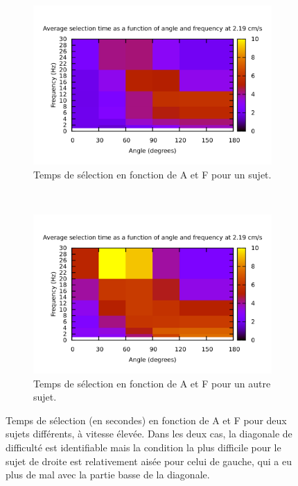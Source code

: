 	\begin{figure}[!htb]
		\begin{subfigure}[t]{0.49\textwidth}
			\centering
			\includegraphics[width=\textwidth]{figures/ch4/08_times_081}
			\caption{Temps de sélection en fonction de A et F pour un sujet.}
			\label{fig:08times}
		\end{subfigure}
		~
		\begin{subfigure}[t]{0.49\textwidth}
			\centering
			\includegraphics[width=\textwidth]{figures/ch4/09_times_081}
			\caption{Temps de sélection en fonction de A et F pour un autre sujet.}
			\label{fig:09times}
		\end{subfigure}
		\caption[Variations entre les sujets]{Temps de sélection (en secondes) en fonction de A et F pour deux sujets différents, à vitesse élevée. Dans les deux cas, la \og diagonale de difficulté \fg{} est identifiable mais la condition la plus difficile pour le sujet de droite est relativement aisée pour celui de gauche, qui a eu plus de mal avec la partie basse de la diagonale.}
		\label{fig:tVariation}
	\end{figure}
	
